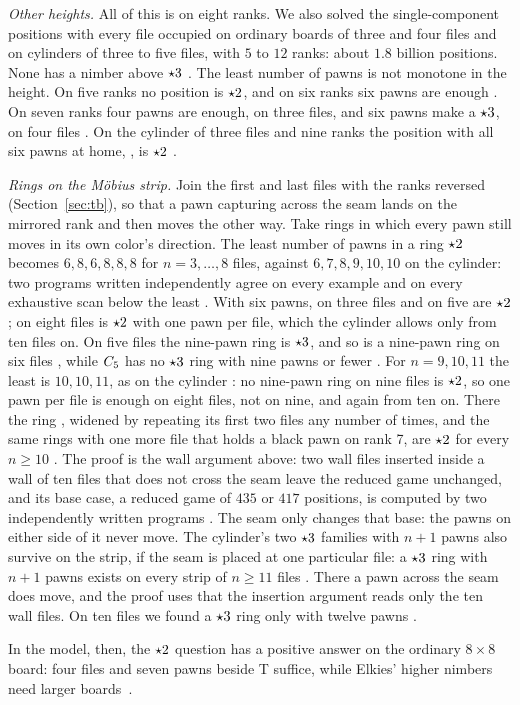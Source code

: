 \emph{Other heights.} All of this is on eight ranks. We also solved the single-component positions with every
file occupied on ordinary boards of three and four files and on cylinders of three to five files, with $5$ to $12$
ranks: about $1.8$ billion positions. None has a nimber above $\mathord{\star3}$ . The least number of pawns is
not monotone in the height. On five ranks no position is $\mathord{\star2}$, and on six ranks six pawns are enough
. On seven ranks four pawns are enough,  on three files, and six pawns make a
$\mathord{\star3}$,  on four files . On the cylinder of three files and nine ranks the
position with all six pawns at home, , is $\mathord{\star2}$ .

\emph{Rings on the M\"obius strip.} Join the first and last files with the ranks reversed
(Section~\ref{sec:tb}), so that a pawn capturing across the seam lands on the mirrored rank and then moves the
other way. Take rings in which every pawn still moves in its own color's direction. The least number of pawns in
a ring $\mathord{\star2}$ becomes $6, 8, 6, 8, 8, 8$ for $n=3,\dots,8$ files, against $6, 7, 8, 9, 10, 10$ on the
cylinder: two programs written independently agree on every example and on every exhaustive scan below the
least . With six pawns,  on three files and 
on five are $\mathord{\star2}$; on eight files  is $\mathord{\star2}$ with one pawn per file,
which the cylinder allows only from ten files on. On five files the nine-pawn ring  is $\mathord{\star3}$, and so is a nine-pawn ring on six files , while $C_{5}$ has no $\mathord{\star3}$ ring with nine pawns or fewer .
For $n=9,10,11$ the least is $10, 10, 11$, as on the cylinder : no nine-pawn ring on nine files is
$\mathord{\star2}$, so one pawn per file is enough on eight files, not on nine, and again from ten on. There the ring
, widened by repeating its first two files any number of times, and
the same rings with one more file that holds a black pawn on rank 7, are $\mathord{\star2}$ for every $n\ge10$ .
The proof is the wall argument above: two wall files inserted inside a wall of ten files that does not
cross the seam leave the reduced game unchanged, and its base case, a reduced game of $435$ or $417$ positions,
is computed by two independently written programs . The seam only changes that base: the pawns on
either side of it never move. The cylinder's two $\mathord{\star3}$ families with $n+1$ pawns also survive on the strip, if
the seam is placed at one particular file: a $\mathord{\star3}$ ring with $n+1$ pawns exists on every strip of $n\ge11$
files . There a pawn across the seam does move, and the proof uses that the insertion argument reads
only the ten wall files. On ten files we found a $\mathord{\star3}$ ring only with twelve pawns .

In the model, then, the $\mathord{\star2}$ question has a positive answer on the ordinary $8\times8$ board: four files
and seven pawns beside T suffice, while Elkies' higher nimbers need larger boards~\cite{Elkies2002}.
